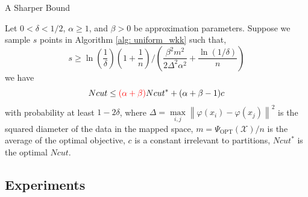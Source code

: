 \documentclass{beamer}
\newcommand{\norm}[1]{\left\lVert#1\right\rVert}
\begin{document}
\begin{frame}{A Sharper Bound}
	\begin{theorem}
		Let $0 < \delta <1/2$, $\alpha \geq 1$, and $\beta >0$ be approximation parameters. Suppose we sample $s$ points in Algorithm \ref{alg: uniform_wkk} such that,
		\begin{equation}
		s \geq \ln(\frac{1}{\delta})(1+\frac{1}{n})/(\frac{\beta^2 m^2}{2\Delta^2 \alpha^2}+\frac{\ln(1/\delta)}{n})
		\end{equation}
		we have
		\begin{equation}
		Ncut \leq \textcolor{red}{(\alpha + \beta)} Ncut^* + (\alpha + \beta -1)c
		\end{equation}
		with probability at least $1-2\delta$, where $\Delta = \max\limits_{i,j}\norm{\varphi(x_i) - \varphi(x_j)}^2$ is the squared diameter of the data in the mapped space, $m = \Psi_\text{OPT}(\mathcal{X})/n$ is the average of the optimal objective, $c$ is a constant irrelevant to partitions, $Ncut^*$ is the optimal $Ncut$.
	\end{theorem}
\end{frame}

\subsection{Experiments}
\end{document}
